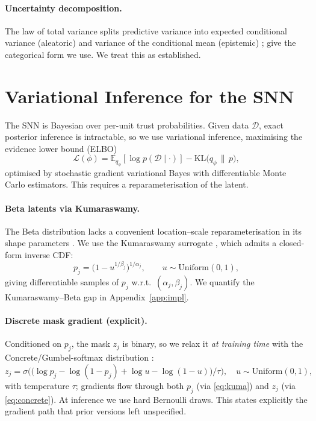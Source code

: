 \documentclass[11pt]{article}
\newcommand{\Eb}{\mathbb{E}}
\newcommand{\KL}{\mathrm{KL}}
\begin{document}
\paragraph{Uncertainty decomposition.}
The law of total variance splits predictive variance into expected conditional variance
(aleatoric) and variance of the conditional mean (epistemic) \citep{depeweg2018};
\citet{kwon2020} give the categorical form we use. We treat this as established.

\section{Variational Inference for the SNN}
The SNN is Bayesian over per-unit trust probabilities. Given data $\mathcal D$, exact
posterior inference is intractable, so we use variational inference, maximising the
evidence lower bound (ELBO)
\begin{equation}
\mathcal L(\phi)=\Eb_{q_\phi}[\log p(\mathcal D\mid\cdot)]-\KL\big(q_\phi\,\|\,p\big),
\end{equation}
optimised by stochastic gradient variational Bayes \citep{kingma2022,rezende2014} with
differentiable Monte Carlo estimators. This requires a reparameterisation of the latent.

\paragraph{Beta latents via Kumaraswamy.}
The Beta distribution lacks a convenient location--scale reparameterisation in its shape
parameters \citep{nalisnick2017}. We use the Kumaraswamy surrogate \citep{mitnik2013},
which admits a closed-form inverse CDF:
\begin{equation}
p_j=\big(1-u^{1/\beta_j}\big)^{1/\alpha_j},\qquad u\sim\mathrm{Uniform}(0,1),
\label{eq:kuma}
\end{equation}
giving differentiable samples of $p_j$ w.r.t.\ $(\alpha_j,\beta_j)$. We quantify the
Kumaraswamy--Beta gap in Appendix~\ref{app:impl}.

\paragraph{Discrete mask gradient (explicit).}
Conditioned on $p_j$, the mask $z_j$ is binary, so we relax it \emph{at training time}
with the Concrete/Gumbel-softmax distribution \citep{maddison2017}:
\begin{equation}
z_j=\sigma\!\Big(\big(\log p_j-\log(1-p_j)+\log u-\log(1-u)\big)/\tau\Big),\quad
u\sim\mathrm{Uniform}(0,1),
\label{eq:concrete}
\end{equation}
with temperature $\tau$; gradients flow through both $p_j$ (via \eqref{eq:kuma}) and
$z_j$ (via \eqref{eq:concrete}). At inference we use hard Bernoulli draws. This states
explicitly the gradient path that prior versions left unspecified.
\end{document}
